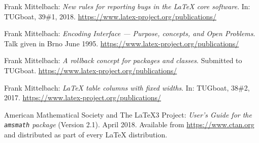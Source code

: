\documentclass{ltnews}
\begin{document}
\begin{thebibliography}{9}

 Frank Mittelbach:
  \emph{New rules for reporting bugs in the \LaTeX{} core software}.
  In: TUGboat, 39\#1, 2018.
  \url{https://www.latex-project.org/publications/}

 Frank Mittelbach:
  \emph{\LaTeXe{} Encoding Interface --- Purpose, concepts, and
   Open Problems}.
  Talk given in Brno June 1995.
  \url{https://www.latex-project.org/publications/}

 Frank Mittelbach:
  \emph{A rollback concept for packages and classes}.
  Submitted to TUGboat.
  \url{https://www.latex-project.org/publications/}

 Frank Mittelbach:
  \emph{\LaTeX{} table columns with fixed widths}.
  In: TUGboat, 38\#2, 2017.
  \url{https://www.latex-project.org/publications/}

 American Mathematical Society and The \LaTeX3 Project:
  \emph{User's Guide for the \texttt{amsmath} package} (Version 2.1).
  April 2018.
  Available from
  \url{https://www.ctan.org}
  and distributed as part of every \LaTeX{} distribution.

\end{thebibliography}
\end{document}
